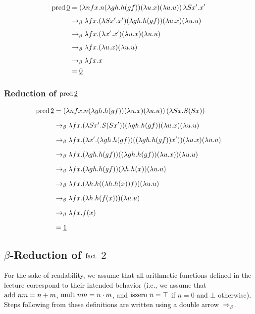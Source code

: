 \[
\begin{aligned}
\mbox{pred}\,\underline{0} &= (\lambda n f x.n(\lambda g h.h(g f))(\lambda u.x)(\lambda u.u))\,\lambda Sx'.x' \\[4pt]
&\rightarrow_\beta \lambda f x.(\lambda S x'.x')(\lambda g h.h(g f))(\lambda u.x)(\lambda u.u) \\[4pt]
&\rightarrow_\beta \lambda f x.(\lambda x'.x')(\lambda u.x)(\lambda u.u) \\[4pt]
&\rightarrow_\beta \lambda f x.(\lambda u.x)(\lambda u.u) \\[4pt]
&\rightarrow_\beta \lambda f x.x \\
&= \underline{0}{}
\end{aligned}
\]

\subsubsection*{Reduction of \(\mbox{pred}\,\underline{2}\)}

\[
\begin{aligned}
  \mbox{pred}\,\underline{2}
  &= (\lambda n f x.n(\lambda g h.h(g f))(\lambda u.x)(\lambda u.u))\,(\lambda S x.S(S x)) \\[6pt]
  &\rightarrow_\beta \lambda f x.(\lambda S x'.S(S x'))(\lambda g h.h(g f))(\lambda u.x)(\lambda u.u) \\[6pt]
  &\rightarrow_\beta \lambda f x.(\lambda x'.(\lambda g h.h(g f))((\lambda g h.h(g f)) x'))(\lambda u.x)(\lambda u.u) \\[6pt]
  &\rightarrow_\beta \lambda f x.(\lambda g h.h(g f))((\lambda g h.h(g f))(\lambda u.x))(\lambda u.u) \\[6pt]
  &\rightarrow_\beta \lambda f x.(\lambda g h.h(g f))(\lambda h.h(x))(\lambda u.u) \\[6pt]
  &\rightarrow_\beta \lambda f x.(\lambda h.h((\lambda h.h(x)) f))(\lambda u.u) \\[6pt]
  &\rightarrow_\beta \lambda f x.(\lambda h.h(f(x)))(\lambda u.u) \\[6pt]
  &\rightarrow_\beta \lambda f x.f(x) \\[6pt]
  &= \underline{1}
\end{aligned}
\]

\subsection{$\beta$-Reduction of $\mbox{fact}{}$ $2$}

For the sake of readability, we assume that all arithmetic functions defined in
the lecture correspond to their intended behavior (i.e., we assume that $\mbox{add}~n
m = n + m$, $\mbox{mult}~n m = n \cdot m$, and $\mbox{iszero}~n = \top$ if $n = 0$ and
$\bot$ otherwise). Steps following from these definitions are written using
a double arrow $\Rightarrow_\beta$.

